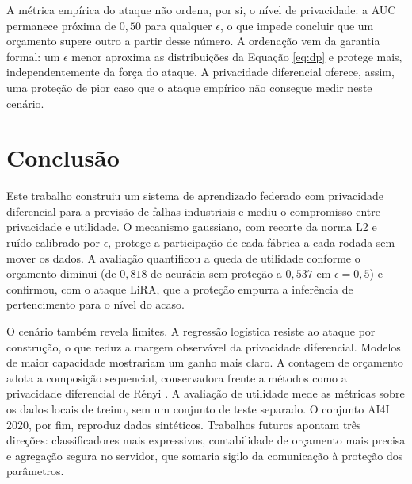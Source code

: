 \documentclass[12pt]{article}
\begin{document}
A métrica empírica do ataque não ordena, por si, o nível de privacidade: a AUC
permanece próxima de $0{,}50$ para qualquer $\epsilon$, o que impede concluir que
um orçamento supere outro a partir desse número. A ordenação vem da garantia formal:
um $\epsilon$ menor aproxima as distribuições da Equação \ref{eq:dp} e protege mais,
independentemente da força do ataque. A privacidade diferencial oferece, assim, uma
proteção de pior caso que o ataque empírico não consegue medir neste cenário.

\section{Conclusão} \label{sec:conc}

Este trabalho construiu um sistema de aprendizado federado com privacidade
diferencial para a previsão de falhas industriais e mediu o compromisso entre
privacidade e utilidade. O mecanismo gaussiano, com recorte da norma L2 e ruído
calibrado por $\epsilon$, protege a participação de cada fábrica a cada rodada sem
mover os dados. A avaliação quantificou a queda de utilidade conforme o orçamento
diminui (de $0{,}818$ de acurácia sem proteção a $0{,}537$ em $\epsilon=0{,}5$)
e confirmou, com o ataque LiRA, que a proteção empurra a inferência de pertencimento
para o nível do acaso.

O cenário também revela limites. A regressão logística resiste ao ataque por
construção, o que reduz a margem observável da privacidade diferencial. Modelos de
maior capacidade mostrariam um ganho mais claro. A contagem de orçamento adota a
composição sequencial, conservadora frente a métodos como a privacidade diferencial
de Rényi \cite{mironov2017renyi}. A avaliação de utilidade mede as métricas sobre os dados
locais de treino, sem um conjunto de teste separado. O conjunto AI4I 2020, por fim, reproduz
dados sintéticos. Trabalhos futuros
apontam três direções: classificadores mais expressivos, contabilidade de orçamento
mais precisa e agregação segura no servidor, que somaria sigilo da comunicação à
proteção dos parâmetros.



\end{document}
